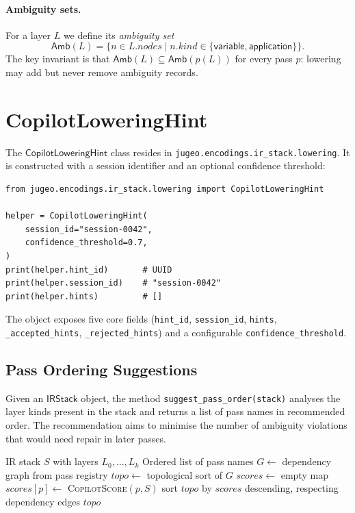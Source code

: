 \documentclass[11pt]{article}
\newcommand{\CLH}{\mathsf{CopilotLoweringHint}}
\newcommand{\IRS}{\mathsf{IRStack}}
\newcommand{\Amb}{\mathsf{Amb}}
\begin{document}
\paragraph{Ambiguity sets.}
For a layer $L$ we define its \emph{ambiguity set}
\[
  \Amb(L) = \{ n \in L.\mathit{nodes} \mid
    n.\mathit{kind} \in \{\mathsf{variable}, \mathsf{application}\}\}.
\]
The key invariant is that $\Amb(L) \subseteq \Amb(p(L))$ for every
pass $p$: lowering may add but never remove ambiguity records.

\section{CopilotLoweringHint}\label{sec:clh}

The $\CLH$ class resides in
\texttt{jugeo.encodings.ir\_stack.lowering}.  It is constructed with a
session identifier and an optional confidence threshold:

\begin{lstlisting}[style=jugeo-python, caption={Creating a
  $\CLH$ instance.}]
from jugeo.encodings.ir_stack.lowering import CopilotLoweringHint

helper = CopilotLoweringHint(
    session_id="session-0042",
    confidence_threshold=0.7,
)
print(helper.hint_id)       # UUID
print(helper.session_id)    # "session-0042"
print(helper.hints)         # []
\end{lstlisting}

The object exposes five core fields
(\texttt{hint\_id}, \texttt{session\_id}, \texttt{hints},
\texttt{\_accepted\_hints}, \texttt{\_rejected\_hints})
and a configurable \texttt{confidence\_threshold}.

\subsection{Pass Ordering Suggestions}\label{sec:pass-order}

Given an $\IRS$ object, the method
\texttt{suggest\_pass\_order(stack)} analyses the layer kinds present
in the stack and returns a list of pass names in recommended order.
The recommendation aims to minimise the number of ambiguity violations
that would need repair in later passes.

\begin{algorithm}[t]
\caption{$\CLH$.\texttt{suggest\_pass\_order}}\label{alg:pass-order}
\begin{algorithmic}[1]
\REQUIRE IR stack $S$ with layers $L_0, \dots, L_k$
\ENSURE Ordered list of pass names
\STATE $G \leftarrow$ dependency graph from pass registry
\STATE $\mathit{topo} \leftarrow$ topological sort of $G$
\STATE $\mathit{scores} \leftarrow$ empty map
  \STATE $\mathit{scores}[p] \leftarrow$
    \textsc{CopilotScore}$(p, S)$
\ENDFOR
\STATE sort $\mathit{topo}$ by $\mathit{scores}$ descending,
  respecting dependency edges
\RETURN $\mathit{topo}$
\end{algorithmic}
\end{algorithm}
\end{document}

